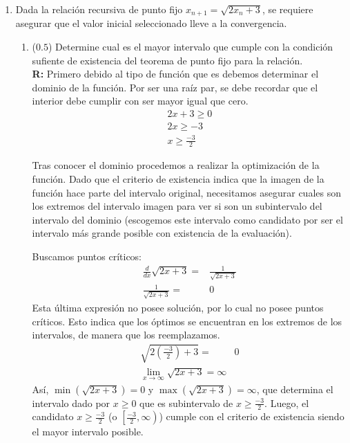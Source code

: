 \documentclass[12pt]{article}
\begin{document}
\vspace{-.5cm}
  \begin{enumerate}[leftmargin=*,widest=9]


    \item Dada la relación recursiva de punto fijo \(x_{n+1} = \sqrt{2x_n + 3}\), se requiere asegurar que el valor inicial seleccionado lleve a la convergencia.

    \begin{enumerate}[label=\alph*]
    \item (\(0.5\)) Determine cual es el mayor intervalo que cumple con la condición sufiente de existencia del teorema de punto fijo para la relación.\\
		\textbf{R:} Primero debido al tipo de función que es debemos determinar el dominio de la función. Por ser una raíz par, se debe recordar que el interior debe cumplir con ser mayor igual que cero.
		\begin{eqnarray*}
		2x + 3 \geq 0\\
		2x \geq -3\\
		x \geq \frac{-3}{2}
		\end{eqnarray*}

		Tras conocer el dominio procedemos a realizar la optimización de la función. Dado que el criterio de existencia indica que la imagen de la función hace parte del intervalo original, necesitamos asegurar cuales son los extremos del intervalo imagen para ver si son un subintervalo del intervalo del dominio (escogemos este intervalo como candidato por ser el intervalo más grande posible con existencia de la evaluación).

		Buscamos puntos críticos:
		\begin{eqnarray*}
		\frac{d}{dx}\sqrt{2x+3} =& \frac{1}{\sqrt{2x+3}}\\
		\frac{1}{\sqrt{2x+3}} = & 0
		\end{eqnarray*}
		Esta última expresión no posee solución, por lo cual no posee puntos críticos. Esto indica que los óptimos se encuentran en los extremos de los intervalos, de manera que los reemplazamos.
		\begin{eqnarray*}
		\sqrt{2\left(\frac{-3}{2}\right) + 3} =& 0\\
		\lim\limits_{x \rightarrow \infty} \sqrt{2x+3} = \infty
		\end{eqnarray*}
		Así, \(\min(\sqrt{2x+3}) = 0\) y \(\max(\sqrt{2x+3}) = \infty \), que determina el intervalo dado por \(x \geq 0\) que es subintervalo de \(x\geq \frac{-3}{2}\). Luego, el candidato \(x\geq \frac{-3}{2}\) (o \(\left[\frac{-3}{2}, \infty\right)\)) cumple con el criterio de existencia siendo el mayor intervalo posible.




\end{enumerate}
\end{enumerate}
\end{document}
